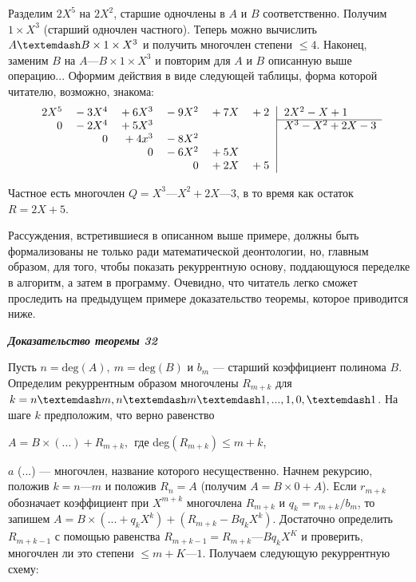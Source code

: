 Разделим $2X^5$ на $2X^2$, старшие одночлены в $A$ и $B$ соответственно. 
Получим $1 \times X^3$ (старший одночлен частного). Теперь можно вычислить 
$A — B \times 1 \times\newline X^3$ и получить многочлен степени $\leq 4$. Наконец, заменим $B$ 
на $A — B \times 1 \times X^3$ и повторим для $A$ и $B$ описанную выше операцию... 
Оформим действия в виде следующей таблицы, форма которой  
читателю, возможно, знакома: 
$$
\begin{array}{rrrrrr@{\,}r|l}
2X^5&{}-3X^4&{}+6X^3&{}-9X^2&{}+7X&{}+2&&\,2X^2-X+1\\
\cline{8-8}
0&{}-2X^4&{}+5X^3&&&&&\,X^3-X^2+2X-3\\
&{}0&{}+4x^3&{}-8X^2&&&&\\
&{}&{}0&{}-6X^2&{}+5X&{}&&\\
&{}&{}&{}0&{}+2X&{}+5&{}&\\
\end{array}
$$

Частное есть многочлен $Q = X^3 — X^2 + 2X — 3$, в то время как 
остаток $R = 2X + 5$. 

Рассуждения, встретившиеся в описанном выше примере, должны 
быть формализованы не только ради математической деонтологии, но, 
главным образом, для того, чтобы показать рекуррентную основу,  
поддающуюся переделке в алгоритм, а затем в программу. Очевидно, что 
читатель легко сможет проследить на предыдущем примере  
доказательство теоремы, которое приводится ниже. 

\noindent\textbf{\textit{Доказательство теоремы 32}}

Пусть $n = \text{deg}(A),\: m = \text{deg}(B)$ и $b_m$ — старший коэффициент  
полинома $B$. Определим рекуррентным образом многочлены $R_{m+k}$ для 
$k = n — m, n — m — 1,\newline ..., 1,0, —1$. На шаге $k$ предположим, что верно 
равенство

\begin{center}
$A = B \times (...) + R_{m+k},\:\:$где deg$(R_{m+k}) \leqslant m + k$,
\end{center} 
\pagebreak

\noindent$a$ (...) — многочлен, название которого несущественно. Начнем  
рекурсию, положив $k = n — m$ и положив $R_n = A$ (получим $A = B \times 0 + A$). 
Если $r_{m+k}$ обозначает коэффициент при $X^{m+k}$ многочлена $R_{m+k}$ и 
$q_k = r_{m+k}\slash b_m$, то запишем $A = B\times (... + q_kX^k) + (R_{m+k} - Bq_kX^k)$.  
Достаточно определить $R_{m+k-1}$ с помощью равенства $R_{m+k-1} = R_{m+k} — 
Bq_kX^K$ и проверить, многочлен ли это степени $\leqslant m + K — 1$. Получаем 
следующую рекуррентную схему:


